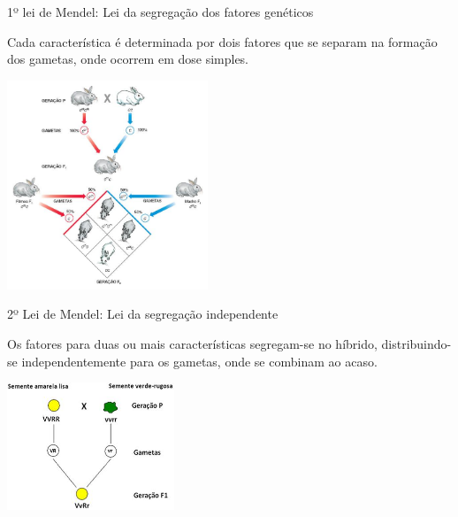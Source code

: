 \documentclass[]{beamer}
\begin{document}
  \begin{frame}{1º lei de Mendel: Lei da segregação dos fatores genéticos}
    \begin{center}
      Cada característica é determinada por dois fatores que se separam na formação dos gametas, onde ocorrem em dose simples.

      \hspace{0.5cm}

      \includegraphics[width=6cm]{images/coelhos.png}
    \end{center}
  \end{frame}

  \begin{frame}{2º Lei de Mendel: Lei da segregação independente}
    \begin{center}
      Os fatores para duas ou mais características segregam-se no híbrido, distribuindo-se independentemente para os gametas, onde se combinam ao acaso.

      \hspace{0.5cm}

      \includegraphics[width=5cm]{images/image1.png}
    \end{center}
  \end{frame}
\end{document}
